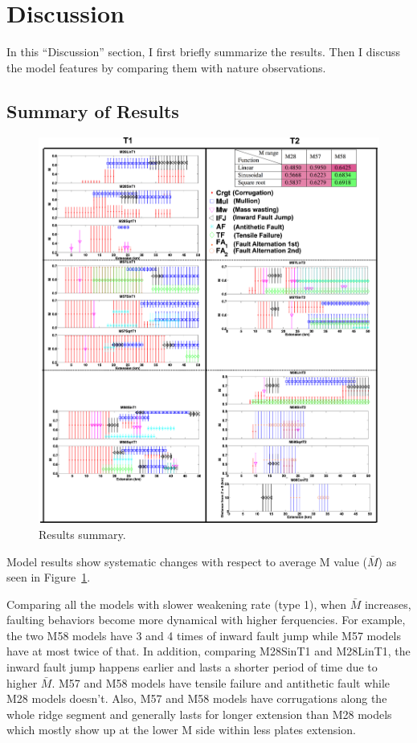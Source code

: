\pagebreak
\section{Discussion}
In this ``Discussion'' section, I first briefly summarize the results. Then I discuss the model features by comparing them with nature observations.

\subsection{Summary of Results}
\begin{figure}[H]
  \centering
    \includegraphics[width=1.05\textwidth]{./Figures/fig_Discussion_Result_Summary_1_Combine_together.eps}
  \caption{Results summary.}
 \label{fig_Discussion_Result_Summary_1_Combine_together}
\end{figure}   

Model results show systematic changes with respect to average M value ($\bar{M}$) as seen in Figure~\hyperref[fig_Discussion_Result_Summary_1_Combine_together]{\ref{fig_Discussion_Result_Summary_1_Combine_together}}.

Comparing all the models with slower weakening rate (type 1), when $\bar{M}$ increases, faulting behaviors become more dynamical with higher ferquencies. For example, the two M58 models have 3 and 4 times of inward fault jump while M57 models have at most twice of that. In addition, comparing M28SinT1 and M28LinT1, the inward fault jump happens earlier and lasts a shorter period of time due to higher $\bar{M}$. M57 and M58 models have tensile failure and antithetic fault while M28 models doesn't. Also, M57 and M58 models have corrugations along the whole ridge segment and generally lasts for longer extension than M28 models which mostly show up at the lower M side within less plates extension.

